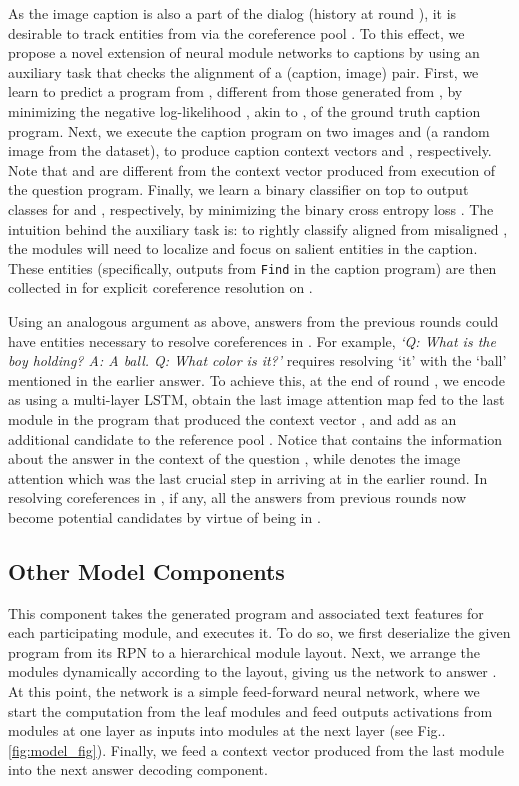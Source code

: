 \documentclass[runningheads]{llncs}
\makeatletter
\DeclareRobustCommand\onedot{\futurelet\@let@token\@onedot}
\def\@onedot{\ifx\@let@token.\else.\null\fi\xspace}
\def\Fig{Fig\onedot}
\newcommand{\myparagraph}[1]{\vspace{0pt}\noindent{\bf #1}}
\makeatother
\begin{document}
\myparagraph{Modules on captions.}
As the image caption  is also a part of the dialog (history  at round ),
it is desirable to track entities from  via the coreference pool 
.
To this effect, we propose a novel extension of neural module networks to 
captions by using an auxiliary task that checks the alignment of a (caption, 
image) pair.
First, we learn to predict a program from , different from those generated 
from , by minimizing the negative log-likelihood ,
akin to , of the ground truth caption program.
Next, we execute the caption program on two images  and  
(a random image from the dataset), to produce caption context vectors 
and , respectively.
Note that  and  are different from the context vector  
produced from execution of the question program.
Finally, we learn a binary classifier on top to output classes  for 
 and , respectively, by minimizing the binary cross entropy loss 
.
The intuition behind the auxiliary task is:
to rightly classify aligned  from misaligned ,
the modules will need to localize and focus on salient entities in the caption.
These entities (specifically, outputs from \texttt{Find} in the caption program)
are then collected in  for explicit coreference resolution on .


\myparagraph{Entities in answers.}
Using an analogous argument as above, answers from the previous rounds 
 could have entities necessary to resolve coreferences in
.
For example,
\textit{`Q: What is the boy holding? A: A ball. Q: What color is it?'}
requires resolving `it' with the `ball' mentioned in the earlier answer.
To achieve this, at the end of round , we encode 
 as  using a multi-layer LSTM,
obtain the last image attention map  fed to the last module in the program
that produced the context vector , and add  as an additional 
candidate to the reference pool .
Notice that  contains the information about the answer  in
the context of the question , while  denotes the image attention
which was the last crucial step in arriving at  in the earlier round.
In resolving coreferences in , if any, all the answers from previous
rounds now become potential candidates by virtue of being in .




\subsection{Other Model Components}
\label{sec:prog_execute}

\myparagraph{Program Execution.}
This component takes the generated program and associated text features 
 for each participating module, and executes it.
To do so, we first deserialize the given program from its RPN to a hierarchical
module layout.
Next, we arrange the modules dynamically according to the layout, giving us the 
network to answer .
At this point, the network is a simple feed-forward neural network, where we
start the computation from the leaf modules and feed outputs activations from 
modules at one layer as inputs into modules at the next layer 
(see \Fig\ref{fig:model_fig}).
Finally, we feed a context vector  produced from the last module into
the next answer decoding component.
\end{document}
